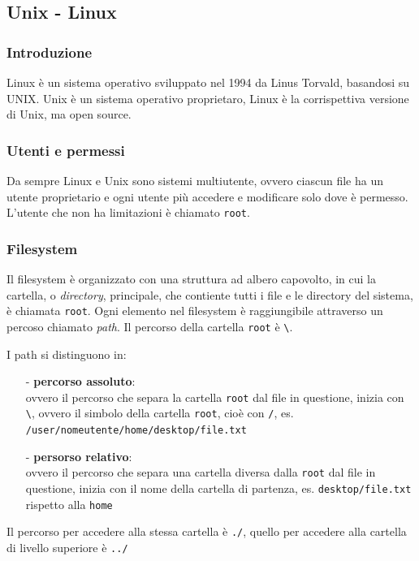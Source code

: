 \documentclass[a4paper]{article}
\begin{document}
\newpage


\subsection{Unix - Linux}
\subsubsection*{Introduzione}
Linux è un sistema operativo sviluppato nel 1994 da Linus Torvald, basandosi su UNIX.
Unix è un sistema operativo proprietaro, Linux è la corrispettiva versione di Unix, ma open source.

\subsubsection*{Utenti e permessi}
Da sempre Linux e Unix sono sistemi multiutente, ovvero ciascun file ha un utente proprietario e ogni utente più accedere
e modificare solo dove è permesso. L'utente che non ha limitazioni è chiamato \verb|root|.

\subsubsection*{Filesystem}
Il filesystem è organizzato con una struttura ad albero capovolto, in cui la cartella, o \textit{directory}, principale,
che contiente tutti i file e le directory del sistema, è chiamata \verb|root|. Ogni elemento nel filesystem è raggiungibile
attraverso un percoso chiamato \textit{path}. Il percorso della cartella \verb|root| è \verb|\|.

I path si distinguono in:
\begin{itemize} [topsep=3pt, itemsep=0pt]
	\item[-] \textbf{percorso assoluto}: \\
	ovvero il percorso che separa la cartella \verb|root| dal file in questione, inizia con \verb|\|, ovvero il simbolo della
	cartella \verb|root|, cioè con \verb|/|, es. \verb|/user/nomeutente/home/desktop/file.txt|
	\item[-] \textbf{persorso relativo}: \\
	ovvero il percorso che separa una cartella diversa dalla \verb|root| dal file in questione, inizia con il nome della cartella
	di partenza, es. \verb|desktop/file.txt| rispetto alla \verb|home|
\end{itemize}
Il percorso per accedere alla stessa cartella è \verb|./|, quello per accedere alla cartella di livello superiore è \verb|../|
\end{document}
